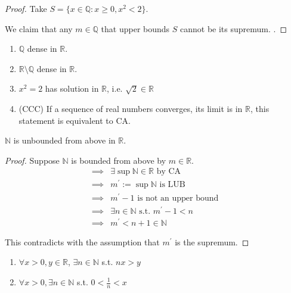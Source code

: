 \begin{proof}
    Take $S = \{ x \in \mathbb{Q}: x \geq 0, x^2 < 2 \} $. 

    We claim that any $m \in \mathbb{Q}$ that upper bounds 
    $S$ cannot be its supremum. 
    .
\end{proof}

\begin{remark}[Implications of CA]
    \medskip
    \begin{enumerate}
        \item $\mathbb{Q}$ dense in $\mathbb{R}$.
        \item $\mathbb{R} \setminus \mathbb{Q}$ dense in $\mathbb{R}$.
        \item $x^2 = 2$ has solution in $\mathbb{R}$, i.e. $\sqrt{2} \in \mathbb{R}$
        \item (CCC) If a sequence of real numbers converges, its limit is in $\mathbb{R}$, 
this statement is equivalent to CA. 
    \end{enumerate}
\end{remark}

\begin{theorem}
    $\mathbb{N}$ is unbounded from above in $\mathbb{R}$.
\end{theorem}

\begin{proof}
    Suppose $\mathbb{N}$ is bounded from above by $m \in \mathbb{R}$. 
    \begin{align*}
        \implies & \exists \sup \mathbb{N} \in \mathbb{R} \text{ by CA} \\
        \implies &m^{\prime} := \sup \mathbb{N} \text{ is LUB} \\
        \implies & m^{\prime} -1 \text{ is not an upper bound} \\
        \implies & \exists n \in \mathbb{N} \text{ s.t. } m^{\prime} - 1 < n \\
        \implies & m^{\prime} < n + 1 \in \mathbb{N}
    \end{align*}

    This contradicts with the assumption that $m^{\prime}$ is the supremum.
\end{proof}

\begin{proposition}
    \hfill
    \begin{enumerate}
        \item $\forall x > 0, y \in \mathbb{R}$, $\exists n \in \mathbb{N}$ s.t. $nx > y$
        \item $\forall x > 0, \exists n \in \mathbb{N}$ s.t. $0 < \frac{1}{n} < x$
    \end{enumerate}
\end{proposition}

